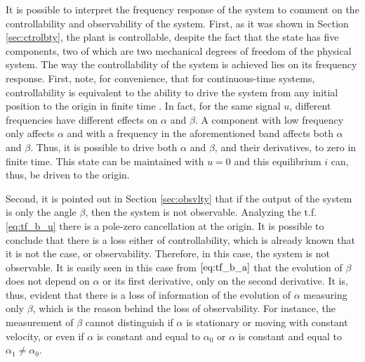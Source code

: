 \documentclass[letterpaper, 10 pt, conference]{ieeeconf}
\begin{document}
It is possible to interpret the frequency response of the system to comment on the controllability and observability of the system. First, as it was shown in Section \ref{sec:ctrolbty}, the plant is controllable, despite the fact that the state has five components, two of which are two mechanical degrees of freedom of the physical system. The way the controllability of the system is achieved lies on its frequency response. First, note, for convenience, that for continuous-time systems, controllability is equivalent to the ability to drive the system from any initial position to the origin in finite time \cite[Definition 9.1]{rugh1996linear}. In fact, for the same signal $u$, different frequencies have different effects on $\alpha$ and $\beta$. A component with low frequency only affects $\alpha$ and with a frequency in the aforementioned band affects both $\alpha$ and $\beta$. Thus, it is possible to drive both $\alpha$ and $\beta$, and their derivatives, to zero in finite time. This state can be maintained with $u=0$ and this equilibrium $i$ can, thus, be driven to the origin. 

Second, it is pointed out in Section \ref{sec:obsvlty} that if the output of the system is only the angle $\beta$, then the system is not observable. Analyzing the t.f. \eqref{eq:tf_b_u} there is a pole-zero cancellation at the origin. It is possible to conclude that there is a loss either of controllability, which is already known that it is not the case, or observability. Therefore, in this case, the system is not observable. It is easily seen in this case from $\eqref{eq:tf_b_a}$ that the evolution of $\beta$ does not depend on $\alpha$ or its first derivative, only on the second derivative. It is, thus, evident that there is a loss of information of the evolution of $\alpha$ measuring only $\beta$, which is the reason behind the loss of observability. For instance, the measurement of $\beta$ cannot distinguish if $\alpha$ is stationary or moving with constant velocity, or even if $\alpha$ is constant and equal to $\alpha_0$ or $\alpha$ is constant and equal to $\alpha_1\neq \alpha_0$. 
\end{document}
